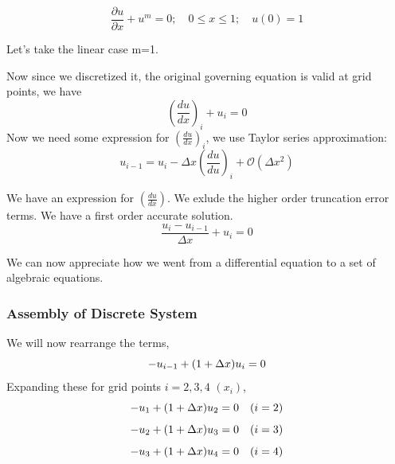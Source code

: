 \documentclass[12pt]{article}
\begin{document}
\begin{equation}
    \frac{\partial u}{\partial x} + u^{m} = 0; \quad 0 \leq x \leq 1; \quad u(0) = 1
\end{equation}

Let's take the linear case m=1. 
\begin{center}
    

\end{center}

Now since we discretized it, the original governing equation is valid at grid points, we have
\begin{equation*}
    (\frac{du}{dx})_{i} + u_{i} = 0
\end{equation*}
Now we need some expression for $(\frac{du}{dx})_{i}$, we use Taylor series approximation:
\begin{equation*}
    u_{i-1}  = u_{i} - \Delta x (\frac{du}{du})_{i} + \mathcal{O}(\Delta x^{2})
\end{equation*}

We have an expression for $(\frac{du}{dx})$. We exlude the higher order truncation error terms. We have a first order accurate solution.
\begin{equation}
    \frac{u_i - u_{i-1}}{\Delta x} + u_i = 0
\end{equation}

We can now appreciate how we went from a differential equation to a set of algebraic equations. 
\subsubsection{Assembly of Discrete System}
We will now rearrange the terms, 
\begin{equation*}
    -u_{i-1} + (1+\Delta x)\space  u_{i} = 0
\end{equation*}
Expanding these for grid points $i = 2,3,4$ $(x_i)$,
\begin{equation}
    -u_{1} + (1+\Delta x)\space u_{2} = 0 \quad (i=2)
\end{equation}
\begin{equation}
    -u_{2} + (1+\Delta x)\space  u_{3} = 0 \quad (i=3)
\end{equation}
\begin{equation}
    -u_{3} + (1+\Delta x)\space  u_{4} = 0 \quad (i=4)
\end{equation}
\end{document}
